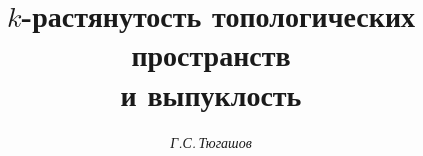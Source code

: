 

 




 


\newcommand{\tts}[1]{} 


\renewcommand{\baselinestretch}{1.03}


 




  


\setcounter{page}{43} 












 


\author{\it Г.С.\,Тюгашов} 




\title{$k$-растянутость топологических пространств\\ и выпуклость} 


 


\date{} 




\pagestyle{plain} %


 




\maketitle 


